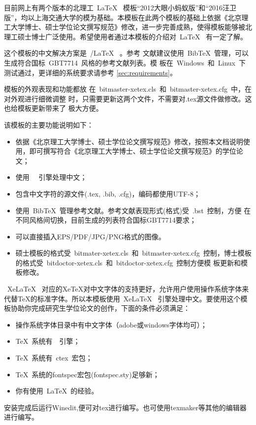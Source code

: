 目前网上有两个版本的北理工~\LaTeX~ 模板“2012大眼小蚂蚁版”和“2016汪卫版”，均以上海交通大学的模为基础。本模板在此两个模板的基础上依据《北京理工大学博士、硕士学位论文撰写规范》修改，进一步完善成熟，使得模板能够被北理工硕士博士广泛使用。希望使用者通过本模板的介绍对~\LaTeX~ 有一定了解。

这个模板的中文解决方案是~\XeTeX/\LaTeX~ 。参考
文献建议使用~BibTeX~管理，可以生成符合国标~GBT7714~风格的参考文献列表。模
板在~Windows~和~Linux~下测试通过，更详细的系统要求请参考
\ref{sec:requirements}。

模板的外观表现和功能都放
在~bitmaster-xetex.cls~和~bitmaster-xetex.cfg~中，在对外观进行细微调整
时，只需要更新这两个文件，不需要对.tex源文件做修改。这也给模板更新带来了
极大方便。

该模板的主要功能说明如下：

\begin{itemize}
\item \inv 依据《北京理工大学博士、硕士学位论文撰写规范》修改，按照本文档说明使用，即可撰写符合《北京理工大学博士、硕士学位论文撰写规范》的学位论文；
\item \inv 使用~\XeTeX~ 引擎处理中文；
\item \inv 包含中文字符的源文件(.tex, .bib, .cfg)，编码都使用UTF-8；
\item \inv 使用~BibTeX~管理参考文献。参考文献表现形式(格式)受~.bst~控制，方便
  在不同风格间切换，目前生成的列表符合国标GBT7714要求；
\item \inv 可以直接插入EPS/PDF/JPG/PNG格式的图像。
\item \inv 硕士模板的格式受~bitmater-xetex.cls~和~bitmaster-xetex.cfg~控制，博士模板的格式受~bitdoctor-xetex.cls~和~bitdoctor-xetex.cfg~控制方便模
  板更新和模板修改。
\end{itemize}
 
~XeLaTeX~ 对应的XeTeX对中文字体的支持更好，允许用户使用操作系统字体来代替TeX的标准字体。所以本模板使用~XeLaTeX~ 引擎处理中文。要使用这个模板协助你完成研究生学位论文的创作，下面的条件必须满足：

\begin{itemize}
\item \inv 操作系统字体目录中有中文字体（adobe或windows字体均可）；
\item \inv \TeX~系统有~\XeTeX~引擎；
\item \inv \TeX~系统有~ctex~宏包；
\item \inv \TeX~系统的fontspec宏包(fontspec.sty)足够新；
\item \inv 你有使用~\LaTeX~的经验。
\end{itemize}

安装完成后运行Winedit,便可对tex进行编写。也可使用texmaker等其他的编辑器进行编写。



